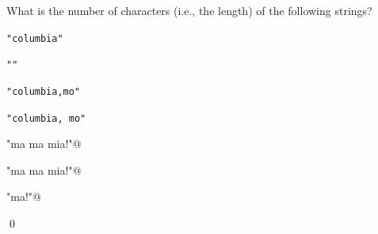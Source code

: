 What is the number of characters (i.e., the length) of the following strings?

\begin{tightlist}

\li \verb!"columbia"!

\li \verb!""!

\li \verb!"columbia,mo"!

\li \verb!"columbia, mo"!

\li \verb@"ma ma mia!"@

\li \verb@"ma ma mia!\n"@

\li \verb@"ma\tma\tmia!\n\n"@

\end{tightlist}

\qed

